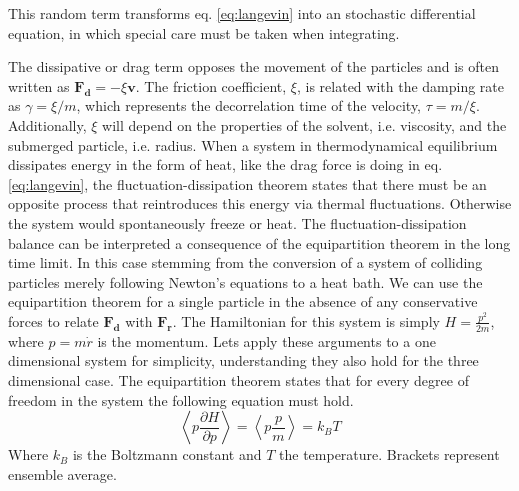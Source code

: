 \documentclass[ twoside,openright,titlepage,numbers=noenddot,%
headinclude,footinclude,cleardoublepage=empty,abstract=on,
BCOR=5mm,paper=a4,fontsize=11pt, dvipsnames
]{scrreprt}
\renewcommand{\vec}[1]{\bm{#1}}
\begin{document}
This random term transforms eq. \eqref{eq:langevin} into an stochastic differential equation, in which special care must be taken when integrating.

The dissipative or drag term opposes the movement of the particles and is often written as $\vec{F_d} = -\xi \vec{v}$. The friction coefficient, $\xi$, is related with the damping rate as $\gamma = \xi/m$, which represents the decorrelation time of the velocity, $\tau = m/\xi$. Additionally, $\xi$ will depend on the properties of the solvent, i.e. viscosity, and the submerged particle, i.e. radius.
When a system in thermodynamical equilibrium dissipates energy in the form of heat, like the drag force is doing in eq. \eqref{eq:langevin}, the fluctuation-dissipation theorem states that there must be an opposite process that reintroduces this energy via thermal fluctuations. Otherwise the system would spontaneously freeze or heat.
The fluctuation-dissipation balance can be interpreted a consequence of the equipartition theorem in the long time limit. In this case stemming from the conversion of a system of colliding particles merely following Newton's equations to a heat bath. We can use the equipartition theorem for a single particle in the absence of any conservative forces to relate $\vec{F_d}$ with $\vec{F_r}$.
The Hamiltonian for this system is simply $H = \frac{p^2}{2m}$, where $p = m\dot{r}$ is the momentum.
Lets apply these arguments to a one dimensional system for simplicity, understanding they also hold for the three dimensional case. The equipartition theorem states that for every degree of freedom in the system the following equation must hold.
\begin{equation}
  \left\langle p \frac{\partial H}{\partial p}\right\rangle = \left\langle p \frac{p}{m}\right\rangle = k_BT
\end{equation}
Where $k_B$ is the Boltzmann constant and $T$ the temperature. Brackets represent ensemble average.
\end{document}
